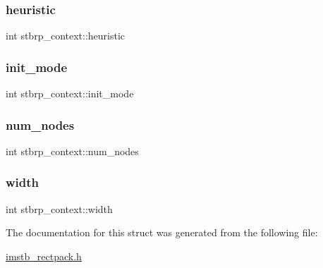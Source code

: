 \subsubsection{\texorpdfstring{heuristic}{heuristic}}
{\footnotesize\ttfamily int stbrp\+\_\+context\+::heuristic}

\mbox{\label{structstbrp__context_a007509feee322404083034e4c2d3dc5d}} 
\subsubsection{\texorpdfstring{init\+\_\+mode}{init\_mode}}
{\footnotesize\ttfamily int stbrp\+\_\+context\+::init\+\_\+mode}

\mbox{\label{structstbrp__context_afa8105d4ef6d3e0ae5aaf8e1ed4b2c58}} 
\subsubsection{\texorpdfstring{num\+\_\+nodes}{num\_nodes}}
{\footnotesize\ttfamily int stbrp\+\_\+context\+::num\+\_\+nodes}

\mbox{\label{structstbrp__context_a70cfcb2044ce8397cc440d28b30c09b2}} 
\subsubsection{\texorpdfstring{width}{width}}
{\footnotesize\ttfamily int stbrp\+\_\+context\+::width}



The documentation for this struct was generated from the following file\+:\begin{DoxyCompactItemize}
\item 
\mbox{\hyperlink{imstb__rectpack_8h}{imstb\+\_\+rectpack.\+h}}\end{DoxyCompactItemize}
